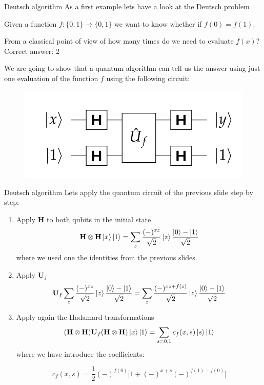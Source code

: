 \documentclass[11p,aspectratio=169]{beamer}
\begin{document}
\begin{frame}{Deutsch algorithm}
    As a first example lets have a look at the Deutsch problem
    \begin{tcolorbox}[title=Deutsch problem]
        Given a function $f : \{0, 1 \} \rightarrow  \{0, 1 \}$ we want to know whether if $f(0) = f(1)$.
    \end{tcolorbox}

    From a classical point of view of how many times do we need to evaluate $f(x)$? 
    \pause 
    Correct answer: 2

    We are going to show that a quantum algorithm can tell us the answer using just one evaluation
     of the function $f$ using the following circuit:

     \begin{figure}
        \includegraphics[width = 0.5 \textwidth]{figures/deutsch.png}
     \end{figure}


\end{frame}

\begin{frame}{Deutsch algorithm}
    Lets apply the quantum circuit of the previous slide step by step:

    \begin{enumerate}
        \item Apply $\textbf{H}$ to both qubits in the initial state
        $$ \textbf{H} \otimes \textbf{H} \ket{x} \ket{1} =
        \sum_z \frac{(-)^{xz}}{\sqrt{2}} \ket{z} \frac{\ket{0} - \ket{1}}{\sqrt{2}}
        $$
        where we used one the identities from the previous slides.
        \item Apply $\textbf{U}_f$
        $$ \textbf{U}_f \sum_z \frac{(-)^{xz}}{\sqrt{2}} \ket{z} \frac{\ket{0} - \ket{1}}{\sqrt{2}} 
        = \sum_z \frac{(-)^{xz + f(z)}}{\sqrt{2}} \ket{z} \frac{\ket{0} - \ket{1}}{\sqrt{2}}  $$
        \item Apply again the Hadamard transformations
        $$ ( \textbf{H} \otimes \textbf{H}) \textbf{U}_f  ( \textbf{H} \otimes \textbf{H}) \ket{x} \ket{1}
        = \sum_{s = 0,1} c_f(x, s) \ket{s} \ket{1} $$
        where we have introduce the coefficients:
         
        $$ c_f(x, s) = \frac{1}{2} (-)^{f(0)} \big[ 1 + (-)^{x+s} (-)^{f(1) - f(0)}\big] $$
    \end{enumerate}
\end{frame}
\end{document}
